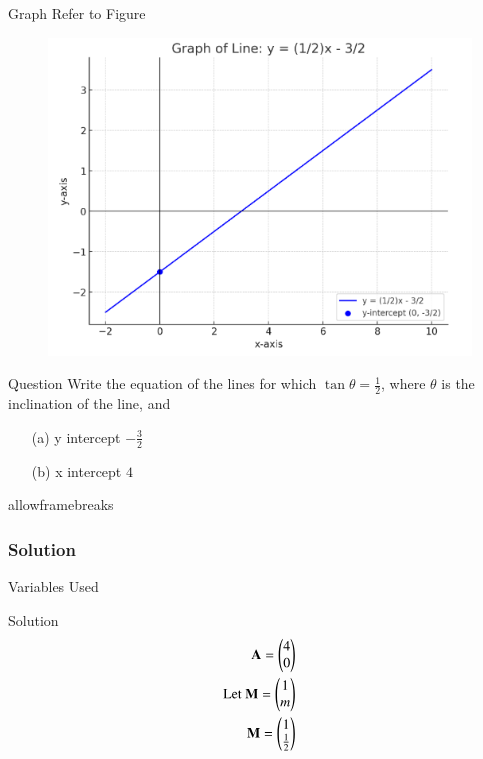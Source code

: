 \documentclass{beamer}
\begin{document}
\begin{frame}{Graph}
   Refer to Figure

\begin{figure}[H]
\begin{center}
\includegraphics[width=0.6\columnwidth]{../figs/grapha.png}
\end{center}
\caption{}
\label{fig:Fig}
\end{figure}  
\end{frame}
\begin{frame}{Question}
Write the equation of the lines for which $\tan\theta = \frac{1}{2}$, where $\theta$ is the inclination of the line, and
\begin{enumerate}
\item[(a)] y intercept $- \frac{3}{2}$
\item[(b)] x intercept $4$
\end{enumerate}
\end{frame}
\begin{frame}{allowframebreaks}
\frametitle{Solution}
\begin{table}[H]    
  \centering
  
  \caption{Variables Used}
  \label{tab:1.10.25}
\end{table}

\end{frame}


\begin{frame}{Solution}
\begin{align}
\mathbf{A}=\begin{pmatrix}
                4
                \\
                 0  \end{pmatrix}\\
\text{Let }\mathbf{M}=\begin{pmatrix}
                           1
                           \\
                            m
                            \end{pmatrix}\\
            \mathbf{M}=\begin{pmatrix}
                           1
                           \\
                            \frac{1}{2}
                            \end{pmatrix}
\end{align}

\end{frame}
\end{document}

